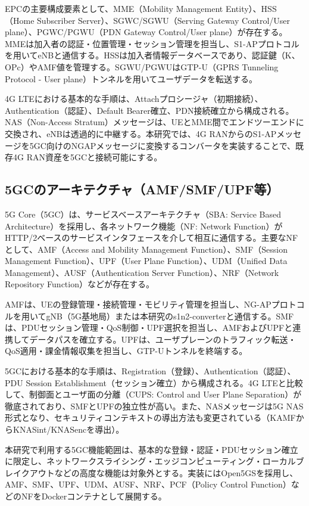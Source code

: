 EPCの主要構成要素として、MME（Mobility Management Entity）、HSS（Home Subscriber Server）、SGWC/SGWU（Serving Gateway Control/User plane）、PGWC/PGWU（PDN Gateway Control/User plane）が存在する。MMEは加入者の認証・位置管理・セッション管理を担当し、S1-APプロトコルを用いてeNBと通信する。HSSは加入者情報データベースであり、認証鍵（K、OPc）やAMF値を管理する。SGWU/PGWUはGTP-U（GPRS Tunneling Protocol - User plane）トンネルを用いてユーザデータを転送する。

4G LTEにおける基本的な手順は、Attachプロシージャ（初期接続）、Authentication（認証）、Default Bearer確立、PDN接続確立から構成される。NAS（Non-Access Stratum）メッセージは、UEとMME間でエンドツーエンドに交換され、eNBは透過的に中継する。本研究では、4G RANからのS1-APメッセージを5GC向けのNGAPメッセージに変換するコンバータを実装することで、既存4G RAN資産を5GCと接続可能にする。

\subsection{5GCのアーキテクチャ（AMF/SMF/UPF等）}

5G Core（5GC）は、サービスベースアーキテクチャ（SBA: Service Based Architecture）を採用し、各ネットワーク機能（NF: Network Function）がHTTP/2ベースのサービスインタフェースを介して相互に通信する。主要なNFとして、AMF（Access and Mobility Management Function）、SMF（Session Management Function）、UPF（User Plane Function）、UDM（Unified Data Management）、AUSF（Authentication Server Function）、NRF（Network Repository Function）などが存在する。

AMFは、UEの登録管理・接続管理・モビリティ管理を担当し、NG-APプロトコルを用いてgNB（5G基地局）または本研究のs1n2-converterと通信する。SMFは、PDUセッション管理・QoS制御・UPF選択を担当し、AMFおよびUPFと連携してデータパスを確立する。UPFは、ユーザプレーンのトラフィック転送・QoS適用・課金情報収集を担当し、GTP-Uトンネルを終端する。

5GCにおける基本的な手順は、Registration（登録）、Authentication（認証）、PDU Session Establishment（セッション確立）から構成される。4G LTEと比較して、制御面とユーザ面の分離（CUPS: Control and User Plane Separation）が徹底されており、SMFとUPFの独立性が高い。また、NASメッセージは5G NAS形式となり、セキュリティコンテキストの導出方法も変更されている（KAMFからKNASint/KNASencを導出）。

本研究で利用する5GC機能範囲は、基本的な登録・認証・PDUセッション確立に限定し、ネットワークスライシング・エッジコンピューティング・ローカルブレイクアウトなどの高度な機能は対象外とする。実装にはOpen5GSを採用し、AMF、SMF、UPF、UDM、AUSF、NRF、PCF（Policy Control Function）などのNFをDockerコンテナとして展開する。

